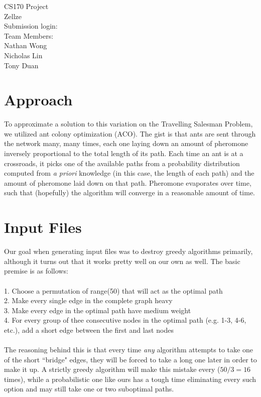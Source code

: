 \documentclass{article}
\newcommand{\tab}[0]{\hspace*{0.5in}}
\begin{document}
\begin{center}
    CS170 Project\\
    Zellze \\
    Submission login: \\
    Team Members: \\
    Nathan Wong \\
    Nicholas Lin \\
    Tony Duan
\end{center}

\section*{Approach}
To approximate a solution to this variation on the Travelling Salesman Problem, we utilized ant colony optimization (ACO). The gist is that ants are sent through the network many, many times, each one laying down an amount of pheromone inversely proportional to the total length of its path. Each time an ant is at a crossroads, it picks one of the available paths from a probability distribution computed from \textit{a priori} knowledge (in this case, the length of each path) and the amount of pheromone laid down on that path. Pheromone evaporates over time, such that (hopefully) the algorithm will converge in a reasonable amount of time. \\

\section*{Input Files}
Our goal when generating input files was to destroy greedy algorithms primarily, although it turns out that it works pretty well on our own as well. The basic premise is as follows: \\\\
\tab 1. Choose a permutation of range(50) that will act as the optimal path \\
\tab 2. Make every single edge in the complete graph heavy \\
\tab 3. Make every edge in the optimal path have medium weight \\
\tab 4. For every group of thee consecutive nodes in the optimal path (e.g. 1-3, 4-6, etc.), add a short edge between the first and last nodes \\\\
The reasoning behind this is that every time \textit{any} algorithm attempts to take one of the short ``bridge" edges, they will be forced to take a long one later in order to make it up. A strictly greedy algorithm will make this mistake every ($50/3 = 16$ times), while a probabilistic one like ours has a tough time eliminating every such option and may still take one or two suboptimal paths. \\
\end{document}
